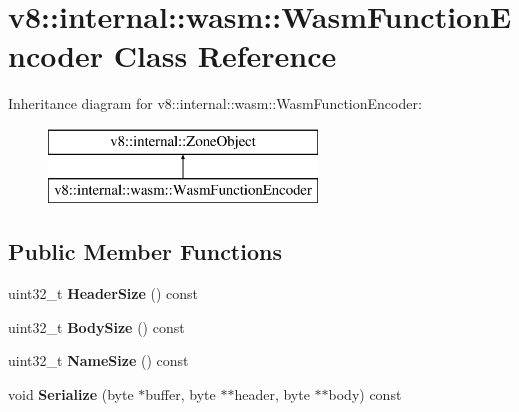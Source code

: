 \hypertarget{classv8_1_1internal_1_1wasm_1_1_wasm_function_encoder}{}\section{v8\+:\+:internal\+:\+:wasm\+:\+:Wasm\+Function\+Encoder Class Reference}
\label{classv8_1_1internal_1_1wasm_1_1_wasm_function_encoder}
Inheritance diagram for v8\+:\+:internal\+:\+:wasm\+:\+:Wasm\+Function\+Encoder\+:\begin{figure}[H]
\begin{center}
\leavevmode
\includegraphics[height=2.000000cm]{classv8_1_1internal_1_1wasm_1_1_wasm_function_encoder}
\end{center}
\end{figure}
\subsection*{Public Member Functions}
\begin{DoxyCompactItemize}
\item 
uint32\+\_\+t {\bfseries Header\+Size} () const \hypertarget{classv8_1_1internal_1_1wasm_1_1_wasm_function_encoder_a4197157cefe6927b8cbad6efc1220b23}{}\label{classv8_1_1internal_1_1wasm_1_1_wasm_function_encoder_a4197157cefe6927b8cbad6efc1220b23}

\item 
uint32\+\_\+t {\bfseries Body\+Size} () const \hypertarget{classv8_1_1internal_1_1wasm_1_1_wasm_function_encoder_ae26cf3807ab43956e8cf33c8de3aed21}{}\label{classv8_1_1internal_1_1wasm_1_1_wasm_function_encoder_ae26cf3807ab43956e8cf33c8de3aed21}

\item 
uint32\+\_\+t {\bfseries Name\+Size} () const \hypertarget{classv8_1_1internal_1_1wasm_1_1_wasm_function_encoder_ab51f70a57ca74712570cc9dbb6bc0960}{}\label{classv8_1_1internal_1_1wasm_1_1_wasm_function_encoder_ab51f70a57ca74712570cc9dbb6bc0960}

\item 
void {\bfseries Serialize} (byte $\ast$buffer, byte $\ast$$\ast$header, byte $\ast$$\ast$body) const \hypertarget{classv8_1_1internal_1_1wasm_1_1_wasm_function_encoder_a8b45379db59fa09343859570cb39f926}{}\label{classv8_1_1internal_1_1wasm_1_1_wasm_function_encoder_a8b45379db59fa09343859570cb39f926}

\end{DoxyCompactItemize}
